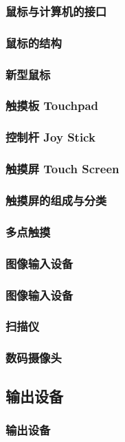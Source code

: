 \documentclass{beamer}
\begin{document}
\begin{frame}
	\frametitle{鼠标与计算机的接口}

\end{frame}

\begin{frame}
	\frametitle{鼠标的结构}

\end{frame}

\begin{frame}
	\frametitle{新型鼠标}

\end{frame}

\begin{frame}
	\frametitle{触摸板 Touchpad}

\end{frame}

\begin{frame}
	\frametitle{控制杆 Joy Stick}

\end{frame}

\begin{frame}
	\frametitle{触摸屏 Touch Screen}

\end{frame}

\begin{frame}
	\frametitle{触摸屏的组成与分类}

\end{frame}

\begin{frame}
	\frametitle{多点触摸}

\end{frame}

\subsubsection{图像输入设备}
\begin{frame}
	\frametitle{图像输入设备}

\end{frame}

\begin{frame}
	\frametitle{扫描仪}

\end{frame}

\begin{frame}
	\frametitle{数码摄像头}

\end{frame}

\subsection{输出设备}
\begin{frame}
	\frametitle{输出设备}

\end{frame}
\end{document}
